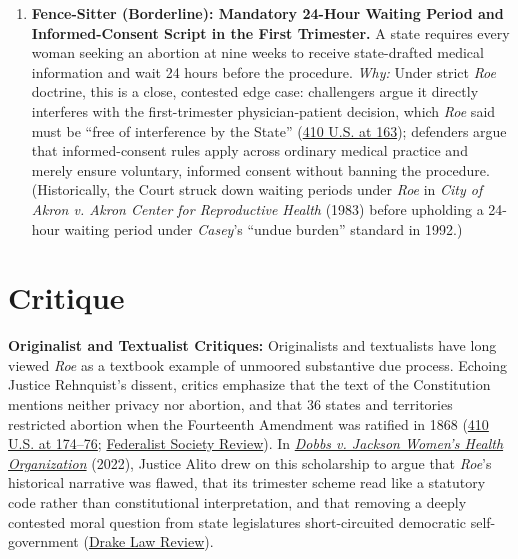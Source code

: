 \documentclass[12pt]{article}
\begin{document}
\begin{enumerate}
\item \textbf{Fence-Sitter (Borderline): Mandatory 24-Hour Waiting Period and Informed-Consent Script in the First Trimester.} A state requires every woman seeking an abortion at nine weeks to receive state-drafted medical information and wait 24 hours before the procedure. \textit{Why:} Under strict \textit{Roe} doctrine, this is a close, contested edge case: challengers argue it directly interferes with the first-trimester physician-patient decision, which \textit{Roe} said must be ``free of interference by the State'' (\href{https://supreme.justia.com/cases/federal/us/410/113/}{410 U.S. at 163}); defenders argue that informed-consent rules apply across ordinary medical practice and merely ensure voluntary, informed consent without banning the procedure. (Historically, the Court struck down waiting periods under \textit{Roe} in \textit{City of Akron v. Akron Center for Reproductive Health} (1983) before upholding a 24-hour waiting period under \textit{Casey}'s ``undue burden'' standard in 1992.)
\end{enumerate}

\section{Critique}

\textbf{Originalist and Textualist Critiques:} Originalists and textualists have long viewed \textit{Roe} as a textbook example of unmoored substantive due process. Echoing Justice Rehnquist's dissent, critics emphasize that the text of the Constitution mentions neither privacy nor abortion, and that 36 states and territories restricted abortion when the Fourteenth Amendment was ratified in 1868 (\href{https://supreme.justia.com/cases/federal/us/410/113/}{410 U.S. at 174--76}; \href{https://fedsoc.org/fedsoc-review/what-will-settle-dobbs}{Federalist Society Review}). In \href{https://www.supremecourt.gov/opinions/21pdf/19-1392_6j37.pdf}{\textit{Dobbs v. Jackson Women's Health Organization}} (2022), Justice Alito drew on this scholarship to argue that \textit{Roe}'s historical narrative was flawed, that its trimester scheme read like a statutory code rather than constitutional interpretation, and that removing a deeply contested moral question from state legislatures short-circuited democratic self-government (\href{https://drakelawreview.org/wp-content/uploads/2024/06/kende-9.0.pdf}{Drake Law Review}).
\end{document}
